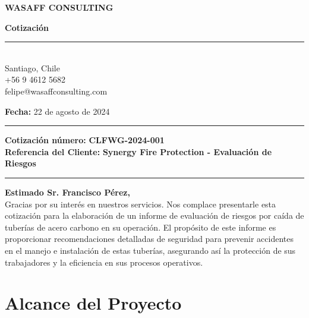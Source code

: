 \documentclass[a4paper,12pt]{article}
\newcommand{\grayline}{\noindent\color{black}\rule{\linewidth}{0.5mm}}
\newcommand{\blueline}{\noindent\color{black}\rule{\linewidth}{0.5mm}}
\begin{document}
\begin{titlepage}
    \centering
    \vspace*{-2cm}
    {\scshape\LARGE \textbf{WASAFF CONSULTING} \par}
    \vspace{0.2cm}
    {\Large \textbf{Cotización} \par}
    \vspace{0.5cm}
    \grayline
    \vspace{0.5cm}
    {\normalsize \\
    Santiago, Chile\\
    +56 9 4612 5682\\
    felipe@wasaffconsulting.com \par}
    \vspace{1cm}
    {\normalsize \textbf{Fecha:} 22 de agosto de 2024 \par}
    \vspace{1cm}
    \blueline
    \vspace{0.2cm}
    {\normalsize \textbf{Cotización número:} \textbf{CLFWG-2024-001}}\\
    \vspace{0.3cm}
    {\normalsize \textbf{Referencia del Cliente:} \textbf{Synergy Fire Protection - Evaluación de Riesgos}}
    \blueline
    \vspace{1.5cm}
    \begin{flushleft}
    \normalsize \textbf{Estimado Sr. Francisco Pérez,}\\
    \vspace{0.5cm}
    Gracias por su interés en nuestros servicios. Nos complace presentarle esta cotización para la elaboración de un informe de evaluación de riesgos por caída de tuberías de acero carbono en su operación. El propósito de este informe es proporcionar recomendaciones detalladas de seguridad para prevenir accidentes en el manejo e instalación de estas tuberías, asegurando así la protección de sus trabajadores y la eficiencia en sus procesos operativos.
    \end{flushleft}
\end{titlepage}

\section*{Alcance del Proyecto}
\end{document}
